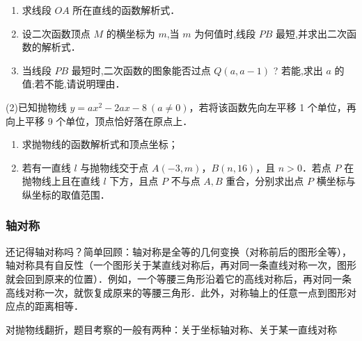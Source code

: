 \begin{minipage}{1\linewidth}
\begin{minipage}{1\linewidth}
\begin{exercise}
\begin{multicols}{2}
    \begin{enumerate}
        \item 求线段 \( OA \) 所在直线的函数解析式．
        \item 设二次函数顶点 \( M \) 的横坐标为 \( m \),当 \( m \) 为何值时,线段 \( PB \) 最短,并求出二次函数的解析式．
        \item 当线段 \( PB \) 最短时,二次函数的图象能否过点 \( Q(a,a-1) \) ? 若能,求出 \( a \) 的值;若不能,请说明理由．
    \end{enumerate}




    (2)已知抛物线 \( y = ax^2 - 2ax - 8 \ (a \neq 0) \)，若将该函数先向左平移 1 个单位，再向上平移 9 个单位，顶点恰好落在原点上．

    \begin{enumerate}
        \item 求抛物线的函数解析式和顶点坐标；
        \item 若有一直线 \( l \) 与抛物线交于点 \( A(-3, m) \)，\( B(n, 16) \)，且 \( n > 0 \)．若点 \( P \) 在抛物线上且在直线 \( l \) 下方，且点 \( P \) 不与点 \( A, B \) 重合，分别求出点 \( P \) 横坐标与纵坐标的取值范围．
    \end{enumerate}
    
    \end{multicols}
    \end{exercise}
    \end{minipage}
\end{minipage}
    










\subsubsection*{轴对称}

还记得轴对称吗？简单回顾：轴对称是全等的几何变换（对称前后的图形全等），轴对称具有自反性（一个图形关于某直线对称后，再对同一条直线对称一次，图形就会回到原来的位置）．例如，一个等腰三角形沿着它的高线对称后，再对同一条高线对称一次，就恢复成原来的等腰三角形．此外，对称轴上的任意一点到图形对应点的距离相等．
\par

对抛物线翻折，题目考察的一般有两种：关于坐标轴对称、关于某一直线对称


